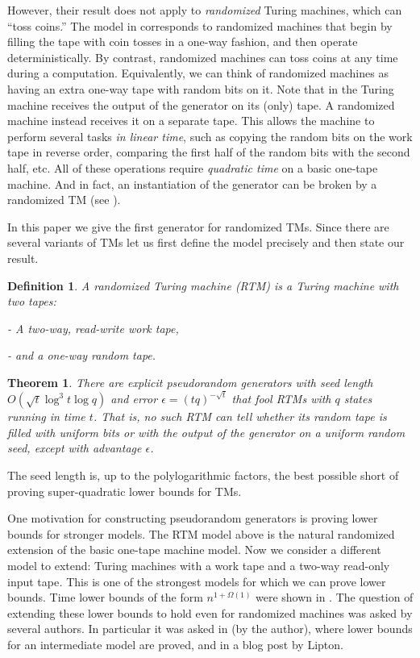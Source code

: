 \documentclass{toc}
\newtheorem{thm}[theorem]{Theorem}
\newtheorem{defn}[theorem]{Definition}
\newcommand{\eps}{\epsilon}
\begin{document}
However,   %
their result does not apply to \emph{randomized} Turing machines,
%
which %
can ``toss coins.'' 
The model in \cite{INW94} corresponds
to randomized machines that begin by filling the tape with coin tosses
in a one-way fashion, and then operate deterministically. By contrast,
randomized machines can toss coins at any time during a computation.
Equivalently, we can think of randomized machines as having an extra
one-way tape with random bits on it. Note that in \cite{INW94} the
Turing machine receives the output of the generator on its (only)
tape. A randomized machine instead receives it on a separate tape.
This allows the machine to perform several tasks \emph{in linear time},
such as copying the random bits on the work tape in reverse order,
comparing the first half of the random bits with the second half,
etc. All of these operations require \emph{quadratic time} on a basic
one-tape machine. And in fact, an instantiation of the \cite{INW94}
generator can be broken by a randomized TM  %
(see ).

In this paper we give the first generator for randomized TMs. Since
there are several variants of TMs let us first define the model precisely
and then state our result.
\begin{defn}
A randomized Turing machine (RTM) is a Turing machine with two tapes:

- A two-way, read-write work tape,

- and a one-way random tape.
\end{defn}

\begin{thm}
\label{thm:prg} There are explicit pseudorandom generators with seed
length $O(\sqrt{t}\log^{3}t\log q)$ and error $\eps=(tq)^{-\sqrt{t}}$
that fool RTMs with $q$ states running in time $t$. That is, no
such RTM can tell whether its random tape is filled with uniform bits
or with the output of the generator on a uniform
random  %
seed, except with advantage $\eps$.
\end{thm}

%

The seed length is, up to the polylogarithmic factors, the best possible
short of proving super-quadratic lower bounds for TMs.

\medskip

One motivation for constructing pseudorandom generators is proving
lower bounds for stronger models. The RTM model above is the natural
randomized extension of the basic one-tape machine model. Now we consider
a different model to extend: Turing machines with a work tape and
a two-way read-only input tape\emph{.} This is one of the strongest
models for which we can prove lower bounds. Time lower bounds of the
form $n^{1+\Omega(1)}$ were shown in \cite{MaS87,DBLP:journals/tcs/MelkebeekR05,DBLP:journals/cc/Williams06}.
The question of extending these lower bounds to hold even for randomized
machines was asked by several authors. In particular it was asked
in \cite{Viola-PhDthesis-journal-hack,ViolaBPvsE} (by the author),
where lower bounds for an intermediate model are proved, and in a
blog post \cite{Lipton-old-ideas-and-lower-bounds-on-sat} by Lipton.
\end{document}
